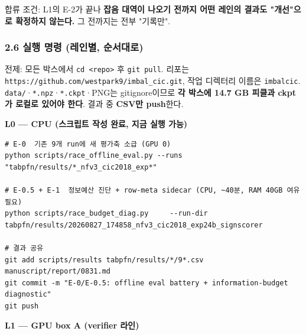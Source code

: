 \par\noindent \textbullet\enspace 합류 조건: L1의 E-2가 끝나 \textbf{잡음 대역이 나오기 전까지 어떤 레인의 결과도 "개선"으로 확정하지 않는다.} 그 전까지는 전부 "기록만".


\subsubsection{2.6 실행 명령 (레인별, 순서대로)}
전제: 모든 박스에서 \texttt{cd <repo\allowbreak{}>} 후 \texttt{git pull\allowbreak{}}. 리포는 \texttt{https:/\allowbreak{}\allowbreak{}/\allowbreak{}\allowbreak{}github.\allowbreak{}c\allowbreak{}om/\allowbreak{}\allowbreak{}westp\allowbreak{}ark9/\allowbreak{}\allowbreak{}imb\allowbreak{}al\_\allowbreak{}\allowbreak{}cic.\allowbreak{}g\allowbreak{}it}, 작업 디렉터리 이름은 \texttt{imbalcic\allowbreak{}}. \texttt{data/\allowbreak{}\allowbreak{}}·\texttt{*.\allowbreak{}npz}·\texttt{*.\allowbreak{}ckpt}·PNG는 gitignore이므로 \textbf{각 박스에 14.7 GB 피클과 ckpt가 로컬로 있어야 한다}. 결과 중 \textbf{CSV만 push}한다.

\textbf{L0 — CPU (스크립트 작성 완료, 지금 실행 가능)}


\begin{Verbatim}[breaklines=true,breakanywhere=true,fontsize=\scriptsize]
# E-0  기존 9개 run에 새 평가축 소급 (GPU 0)
python scripts/race_offline_eval.py --runs "tabpfn/results/*_nfv3_cic2018_exp*"

# E-0.5 + E-1  정보예산 진단 + row-meta sidecar (CPU, ~40분, RAM 40GB 여유 필요)
python scripts/race_budget_diag.py     --run-dir tabpfn/results/20260827_174858_nfv3_cic2018_exp24b_signscorer

# 결과 공유
git add scripts/results tabpfn/results/*/9*.csv manuscript/report/0831.md
git commit -m "E-0/E-0.5: offline eval battery + information-budget diagnostic"
git push

\end{Verbatim}
\textbf{L1 — GPU box A (verifier 라인)}


